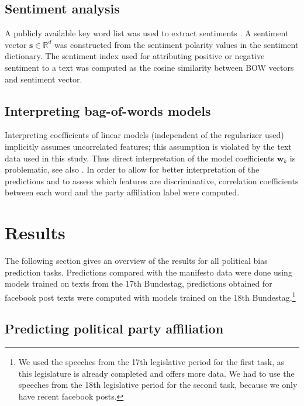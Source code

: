 \documentclass[11pt]{article}
\renewcommand{\vec}[1]{\mathbf{#1}}
\newcommand{\R}{\mathds{R}}
\begin{document}
\subsection{Sentiment analysis}\label{sec:sentiment_analysis_methods}
A publicly available key word list was used to extract sentiments \cite{remquahey2010}. A sentiment vector $\vec{s}\in\R^d$ was constructed from the sentiment polarity values in the sentiment dictionary. The sentiment index used for attributing positive or negative sentiment to a text was computed as the cosine similarity between BOW vectors and sentiment vector.

\subsection{Interpreting bag-of-words models}\label{sec:correlations_methods}
Interpreting coefficients of linear models (independent of the regularizer used) implicitly assumes uncorrelated features; this assumption is violated by the text data used in this study. Thus direct interpretation of the model coefficients $\vec{w}_k$ is problematic, see also \cite{Zien2009, Haufe2013}. In order to allow for better interpretation of the predictions and to assess which features are discriminative, correlation coefficients between each word and the party affiliation label were computed. 

\section{Results}\label{sec:results}

The following section gives an overview of the results for all political bias prediction tasks. 
Predictions compared with the manifesto data were done using models trained on texts from the 17th Bundestag, predictions obtained for facebook post texts were computed with models trained on the 18th Bundestag.\footnote{We used the speeches from the 17th legislative period for the first task, as this legislature is already completed and offers more data. We had to use the speeches from the 18th legislative period for the second task, because we only have recent facebook posts.}

\subsection{Predicting political party affiliation}
\end{document}
